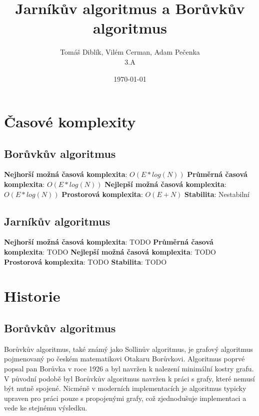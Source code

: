 \documentclass[11pt]{article}
\author{Tomáš Diblík, Vilém Cerman, Adam Pečenka \\ 3.A}
\title{Jarníkův algoritmus a Borůvkův algoritmus}
\date{\selectlanguage{czech}\today}
\begin{document}
\maketitle
\thispagestyle{empty}
\pagebreak

\tableofcontents
\thispagestyle{empty}
\pagebreak

\setcounter{page}{1}
\section{Časové komplexity}

\subsection{Borůvkův algoritmus}

\medbreak
\textbf{Nejhorší možná časová komplexita}: $O(E * log(N))$
\medbreak\noindent
\textbf{Průměrná časová komplexita}: $O(E * log(N))$
\medbreak\noindent
\textbf{Nejlepší možná časová komplexita}: $O(E * log(N))$
\medbreak\noindent
\textbf{Prostorová komplexita}: $O(E + N)$
\medbreak\noindent
\textbf{Stabilita}: Nestabilní
\medbreak

\subsection{Jarníkův algoritmus}

\medbreak
\textbf{Nejhorší možná časová komplexita}: TODO
\medbreak\noindent
\textbf{Průměrná časová komplexita}: TODO
\medbreak\noindent
\textbf{Nejlepší možná časová komplexita}: TODO
\medbreak\noindent
\textbf{Prostorová komplexita}: TODO
\medbreak\noindent
\textbf{Stabilita}: TODO
\medbreak

\pagebreak


\section{Historie}

\subsection{Borůvkův algoritmus}
Borůvkův algoritmus, také známý jako Sollinův algoritmus, je grafový algoritmus pojmenovaný po 
českém matematikovi Otakaru Borůvkovi. Algoritmus poprvé popsal pan Borůvka v roce 1926 a byl 
navržen k nalezení minimální kostry grafu. 
V původní podobě byl Borůvkův algoritmus navržen k práci s grafy, které nemusí být nutně spojené. 
Nicméně v moderních implementacích je algoritmus typicky upraven pro práci pouze s 
propojenými grafy, což zjednodušuje implementaci a vede ke stejnému výsledku.
\end{document}
